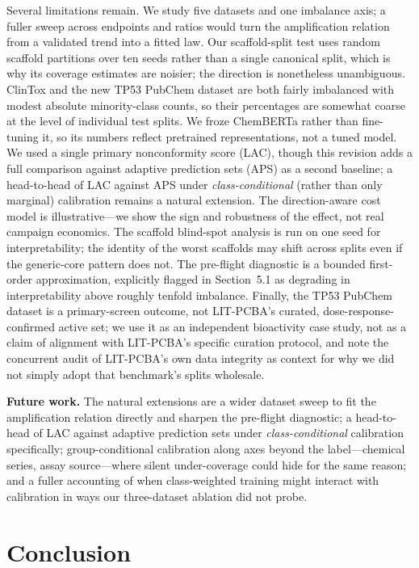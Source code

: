 \documentclass[11pt]{article}
\begin{document}
Several limitations remain. We study five datasets and one imbalance axis; a fuller sweep across
endpoints and ratios would turn the amplification relation from a validated trend into a fitted
law. Our scaffold-split test uses random scaffold partitions over ten seeds rather than a single
canonical split, which is why its coverage estimates are noisier; the direction is nonetheless
unambiguous. ClinTox and the new TP53 PubChem dataset are both fairly imbalanced with modest
absolute minority-class counts, so their percentages are somewhat coarse at the level of individual
test splits. We froze ChemBERTa rather than fine-tuning it, so its numbers reflect pretrained
representations, not a tuned model. We used a single primary nonconformity score (LAC), though this
revision adds a full comparison against adaptive prediction sets (APS) as a second baseline; a
head-to-head of LAC against APS under \emph{class-conditional} (rather than only marginal)
calibration remains a natural extension. The direction-aware cost model is illustrative---we show
the sign and robustness of the effect, not real campaign economics. The scaffold blind-spot
analysis is run on one seed for interpretability; the identity of the worst scaffolds may shift
across splits even if the generic-core pattern does not. The pre-flight diagnostic is a bounded
first-order approximation, explicitly flagged in Section~5.1 as degrading in interpretability above
roughly tenfold imbalance. Finally, the TP53 PubChem dataset is a primary-screen outcome, not
LIT-PCBA's curated, dose-response-confirmed active set; we use it as an independent bioactivity
case study, not as a claim of alignment with LIT-PCBA's specific curation protocol, and note the
concurrent audit of LIT-PCBA's own data integrity \cite{huang2025} as context for why we did not
simply adopt that benchmark's splits wholesale.

\textbf{Future work.} The natural extensions are a wider dataset sweep to fit the amplification
relation directly and sharpen the pre-flight diagnostic; a head-to-head of LAC against adaptive
prediction sets under \emph{class-conditional} calibration specifically; group-conditional
calibration along axes beyond the label---chemical series, assay source---where silent
under-coverage could hide for the same reason; and a fuller accounting of when class-weighted
training might interact with calibration in ways our three-dataset ablation did not probe.

\section{Conclusion}
\end{document}
